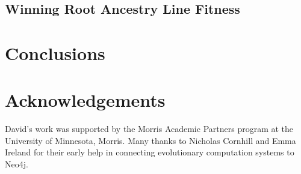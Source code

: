 \documentclass[12pt]{article}
\begin{document}
\subsection{Winning Root Ancestry Line Fitness}
\label{sec:WinningRootLineFitness}


\section{Conclusions} \label{sec:conclusion}



\section*{Acknowledgements}

David's work was supported by the Morris Academic Partners program at the University of Minnesota, Morris. Many thanks to Nicholas Cornhill and Emma Ireland for their early help in connecting evolutionary computation systems to Neo4j.

\pagebreak



\end{document}
